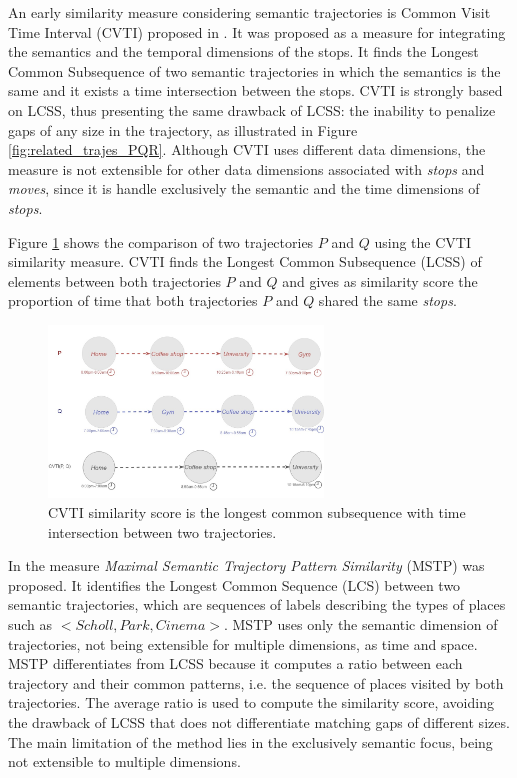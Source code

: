 \documentclass[12pt]{article}
\begin{document}
An early similarity measure considering semantic trajectories is Common Visit Time Interval (CVTI) proposed in \cite{Kang:2009:SMT:1529282.1529580}. It was proposed as a measure for integrating the semantics {and the temporal dimensions of the stops}. It finds the Longest Common Subsequence of two semantic trajectories in {which the semantics is the same and it exists a time intersection between the stops}.
CVTI is strongly based on LCSS, thus presenting the same drawback of LCSS: the inability to penalize gaps of any size in the trajectory, as illustrated in Figure \ref{fig:related_trajes_PQR}. Although CVTI uses different data dimensions, the measure is not extensible for other data dimensions associated with \emph{stops} and \emph{moves}{, since it is handle exclusively the semantic and the time dimensions of \emph{stops}}.

Figure \ref{fig:related_trajes_CVTI} shows the comparison of two trajectories $P$ and $Q$ using the CVTI similarity measure. CVTI finds the Longest Common Subsequence (LCSS) of elements between both trajectories $P$ and $Q$ and gives as similarity score the proportion of time that both trajectories $P$ and $Q$ shared the same \emph{stops}.

\begin{figure}[h]
\centering
\includegraphics[width=0.65\textwidth]{Related_Works/Semantic_Trajectories_(CVTI).jpg}
\caption{\label{fig:related_trajes_CVTI}CVTI similarity score is the longest common subsequence with time intersection between two trajectories.}
\end{figure}

In \cite{Ying:2010:MUS:1867699.1867703} the measure \emph{Maximal Semantic Trajectory Pattern Similarity} (MSTP) was proposed. It identifies the Longest Common Sequence (LCS) between two semantic trajectories, which are sequences of labels describing the types of places such as $<Scholl, Park, Cinema>$. {MSTP uses only the semantic dimension of trajectories, not being extensible for multiple dimensions, as time and space.} MSTP differentiates from LCSS because it computes a ratio between each trajectory and their common patterns, i.e. the sequence of places visited by both trajectories. The average ratio is used to compute the similarity score, avoiding the drawback of LCSS that does not differentiate matching gaps of different sizes. {The main limitation of the method lies in the exclusively semantic focus, being not extensible to multiple dimensions.}
\end{document}
